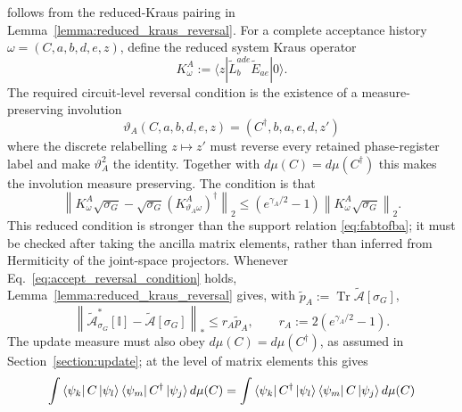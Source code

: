 \documentclass[aps,floatfix,10pt,amssymb,amsfont,amsmath,superscriptaddress,float,nofootinbib,longbibliography,nobalancelastpage,twocolumn]{revtex4-2}
\begin{document}
\begin{widetext}
follows from the reduced-Kraus pairing in
Lemma~\ref{lemma:reduced_kraus_reversal}.  For a complete acceptance history
$\omega=(C,a,b,d,e,z)$, define the reduced system Kraus operator
\begin{equation*}
 K^A_\omega:=\langle z|\tilde L_b^{ade}\tilde E_{ae}|0\rangle .
\end{equation*}
The required circuit-level reversal condition is the existence of a
measure-preserving involution
\begin{equation*}
 \vartheta_A(C,a,b,d,e,z)=(C^\dagger,b,a,e,d,z')
\end{equation*}
where the discrete relabelling $z\mapsto z'$ must reverse every retained
phase-register label and make $\vartheta_A^2$ the identity.  Together with
$d\mu(C)=d\mu(C^\dagger)$ this makes the involution measure preserving.
The condition is that
\begin{equation}
 \left\|K^A_\omega\sqrt{\sigma_G}
 -\sqrt{\sigma_G}(K^A_{\vartheta_A\omega})^\dagger\right\|_2
 \leq\left(e^{\gamma_A/2}-1\right)
 \left\|K^A_\omega\sqrt{\sigma_G}\right\|_2 .
 \label{eq:accept_reversal_condition}
\end{equation}
This reduced condition is stronger than the support relation
\eqref{eq:fabtofba}; it must be checked after taking the ancilla matrix
elements, rather than inferred from Hermiticity of the joint-space
projectors.  Whenever Eq.~\eqref{eq:accept_reversal_condition} holds,
Lemma~\ref{lemma:reduced_kraus_reversal} gives, with
$\tilde p_A:=\operatorname{Tr}\tilde{\mathcal A}[\sigma_G]$,
\begin{equation}
 \left\|\tilde{\mathcal A}_{\sigma_G}^*[\mathbb I]
 -\tilde{\mathcal A}[\sigma_G]\right\|_*
 \leq r_A\tilde p_A,\qquad
 r_A:=2\left(e^{\gamma_A/2}-1\right).
 \label{eq:accept_direct_defect}
\end{equation}
The update measure must also obey $d\mu(C)=d\mu(C^\dagger)$, as assumed in
Section~\ref{section:update}; at the level of matrix elements this gives
\begin{equation}
    \int  \bra{\psi_k}C\ket{\psi_{l}}\bra{\psi_m}C^{\dagger} \ket{\psi_j} d\mu(C) = \int  \bra{\psi_k}C^{\dagger}\ket{\psi_{l}}\bra{\psi_m}C \ket{\psi_j} d\mu(C)
\end{equation}


\end{widetext}
\end{document}
